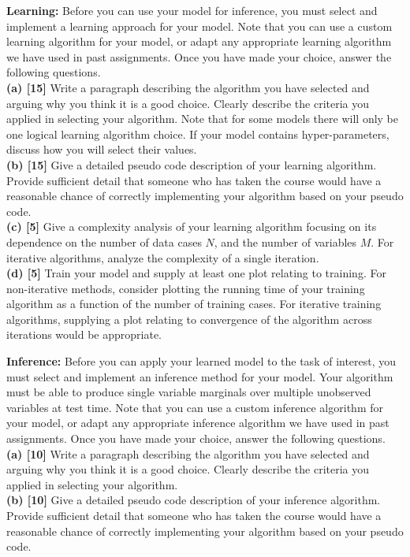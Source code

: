 \documentclass[11pt]{article}
\begin{document}
\begin{problem}{40} \textbf{Learning:} Before you can use your model for inference, you must select and implement a learning approach for your model. Note that you can use a custom learning algorithm for your model, or adapt any appropriate learning algorithm we have used in past assignments. Once you have made your choice, answer the following questions.\\

\textbf{(a) [15]} Write a paragraph describing the algorithm you have selected and arguing why you think it is a good choice. Clearly describe the criteria you applied in selecting your algorithm. Note that for some models there will only be one logical learning algorithm choice. If your model contains
hyper-parameters, discuss how you will select their values.
\\

\textbf{(b) [15]} Give a detailed pseudo code description of your learning algorithm. Provide sufficient detail that someone who has taken the course would have a reasonable chance of correctly implementing your algorithm based on your pseudo code. 
\\

\textbf{(c) [5]} Give a complexity analysis of your learning algorithm focusing on its dependence on the number of data cases $N$, and the number of variables $M$. For iterative algorithms, analyze the complexity of a single iteration.
\\

\textbf{(d) [5]} Train your model and supply at least one plot relating to training. For non-iterative methods, consider plotting the running time of your training algorithm as a function of the number of training cases. For iterative training algorithms, supplying a plot relating to convergence of the algorithm across iterations would be appropriate. 

\end{problem}

\begin{problem}{20} \textbf{Inference:} Before you can apply your learned model to the task of interest, you must select and implement an inference method for your model. Your algorithm must be able to produce single variable marginals over multiple unobserved variables at test time. Note that you can use a custom inference algorithm for your model, or adapt any appropriate inference algorithm we have used in past assignments. Once you have made your choice, answer the following questions.
\\

\textbf{(a) [10]} Write a paragraph describing the algorithm you have selected and arguing why you think it is a good choice. Clearly describe the criteria you applied in selecting your algorithm. 
\\

\textbf{(b) [10]} Give a detailed pseudo code description of your inference algorithm. Provide sufficient detail that someone who has taken the course would have a reasonable chance of correctly implementing your algorithm based on your pseudo code.

\end{problem}
\end{document}
